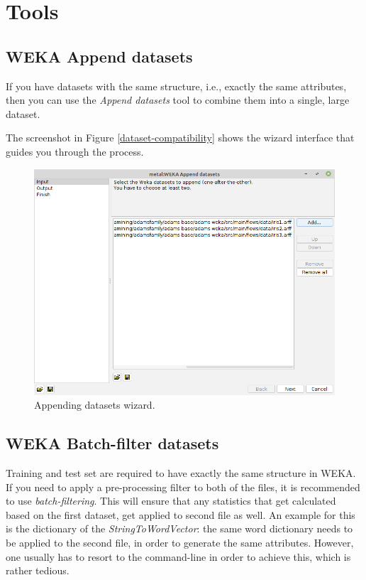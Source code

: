 
\chapter{Tools}

\section{WEKA Append datasets}

If you have datasets with the same structure, i.e., exactly the same
attributes, then you can use the \textit{Append datasets} tool to combine
them into a single, large dataset.

The screenshot in Figure \ref{dataset-compatibility} shows the wizard
interface that guides you through the process.

\begin{figure}[htb]
  \centering
  \includegraphics[width=12.0cm]{images/append_datasets.png}
  \caption{Appending datasets wizard.}
  \label{append_datasets}
\end{figure}

\clearpage
\section{WEKA Batch-filter datasets}

Training and test set are required to have exactly the same structure
in WEKA. If you need to apply a pre-processing filter to both of the
files, it is recommended to use \textit{batch-filtering}. This will
ensure that any statistics that get calculated based on the first
dataset, get applied to second file as well. An example for this is
the dictionary of the \textit{StringToWordVector}: the same word
dictionary needs to be applied to the second file, in order to generate
the same attributes. However, one usually has to resort to the command-line
in order to achieve this, which is rather tedious.

